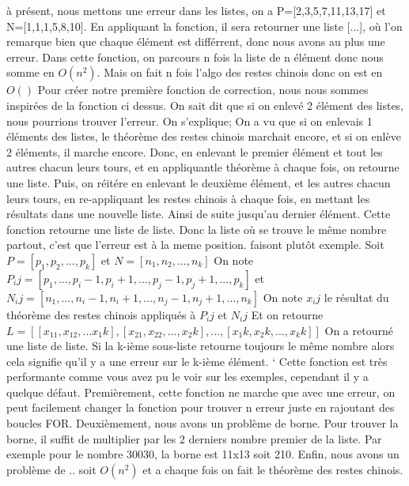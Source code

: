 \documentclass[a4paper, 11pt]{article}
\begin{document}
à présent, nous mettons une erreur dans les listes, on a P=[2,3,5,7,11,13,17] et N=[1,1,1,5,8,10]. En appliquant la fonction, il sera retourner une liste [...], où l'on remarque bien que chaque élément est différrent, donc nous avons au plus une erreur.
Dans cette fonction, on parcours n fois la liste de n élément donc nous somme en $O(n^2)$. Mais on fait n fois l'algo des restes chinois donc on est en $O()$
\newline 
\newline
Pour créer notre première fonction de correction, nous nous sommes inspirées de la fonction ci dessus. On sait dit que si on enlevé 2 élément des listes, nous pourrions trouver l'erreur. On s'explique;
On a vu que si on enlevais 1 éléments des listes, le théorème des restes chinois marchait encore, et si on enlève 2 éléments, il marche encore. Donc, en enlevant le premier élément et tout les autres chacun leurs
tours, et en appliquantle théorème à chaque fois, on retourne une liste. Puis, on réitére en enlevant le deuxième élément, et les autres chacun leurs tours, en re-appliquant les restes chinois à chaque fois, en mettant les résultats dans
une nouvelle liste. Ainsi de suite jusqu'au dernier élément. Cette fonction retourne une liste de liste. Donc la liste où se trouve le même nombre partout, c'est que l'erreur est à la meme position.
faisont plutôt exemple.
\newline
Soit $P=[p_1, p_2, ... , p_k]$ et $N=[n_1 , n_2, ... ,n_k]$ \newline
On note $P_ij =[p_1 , ... , p_i-1 , p_i+1 , ... , p_j-1 , p_j+1 , ... , p_k]$ et $N_ij=[n_1, ..., n_i-1, n_i+1, ..., n_j-1, n_j+1, ..., n_k]$ \newline
On note $x_ij$ le résultat du théorème des restes chinois appliqués à $P_ij$ et $N_ij$ \newline
Et on retourne $L=[[x_11,x_12,...x_1k],[x_21,x_22,...,x_2k],...,[x_1k,x_2k,...,x_kk]]$ \newline
On a retourné une liste de liste. Si la k-ième sous-liste retourne toujours le même nombre alors cela signifie qu'il y a une erreur sur le k-ième élément. \newline`
\newline
Cette fonction est très performante comme vous avez pu le voir sur les exemples, cependant il y a quelque défaut. Premièrement, cette fonction ne marche que avec une erreur,
on peut facilement changer la fonction pour trouver n erreur juste en rajoutant des boucles FOR. Deuxièmement, nous avons un problème de borne. Pour trouver la borne,
il suffit de multiplier par les 2 derniers nombre premier de la liste. \newline
Par exemple pour le nombre 30030, la borne est 11x13 soit 210.\newline
Enfin, nous avons un problème de .. soit $O(n^2)$ et a chaque fois on fait le théorème des restes chinois.
\end{document}
